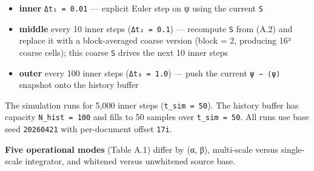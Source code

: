 \documentclass[
]{article}
\providecommand{\tightlist}{%
  \setlength{\itemsep}{0pt}\setlength{\parskip}{0pt}}
\begin{document}
\begin{itemize}
\tightlist
\item
  \textbf{inner} \texttt{Δt₁\ =\ 0.01} --- explicit Euler step on ψ
  using the current \texttt{S}
\item
  \textbf{middle} every 10 inner steps (\texttt{Δt₂\ =\ 0.1}) ---
  recompute \texttt{S} from (A.2) and replace it with a block-averaged
  coarse version (block = 2, producing 16³ coarse cells); this coarse
  \texttt{S} drives the next 10 inner steps
\item
  \textbf{outer} every 100 inner steps (\texttt{Δt₃\ =\ 1.0}) --- push
  the current \texttt{ψ\ −\ ⟨ψ⟩} snapshot onto the history buffer
\end{itemize}

The simulation runs for 5,000 inner steps (\texttt{t\_sim\ =\ 50}). The
history buffer has capacity \texttt{N\_hist\ =\ 100} and fills to 50
samples over \texttt{t\_sim\ =\ 50}. All runs use base seed
\texttt{20260421} with per-document offset \texttt{17i}.

\textbf{Five operational modes} (Table A.1) differ by (α, β),
multi-scale versus single-scale integrator, and whitened versus
unwhitened source base.
\end{document}
